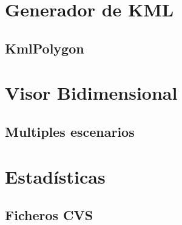\section*{Generador de KML}
\subsection*{KmlPolygon}
\section*{Visor Bidimensional}
\subsection*{Multiples escenarios}
\section*{Estadísticas}
\subsection*{Ficheros CVS}